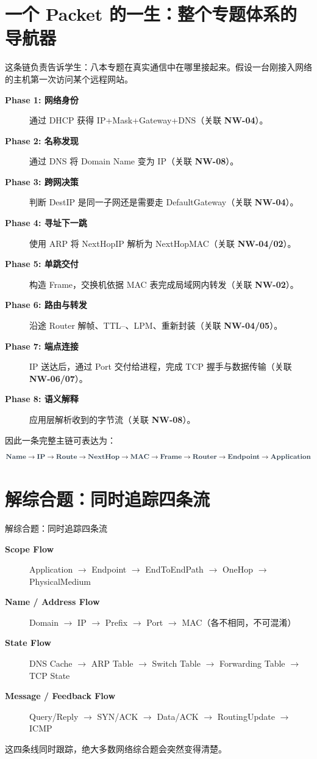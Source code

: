 \documentclass[11pt,a4paper,openany]{ctexbook}
\newcommand{\key}[1]{\textbf{\color{deep}#1}}
\begin{document}
\section{一个 Packet 的一生：整个专题体系的导航器}
这条链负责告诉学生：八本专题在真实通信中在哪里接起来。假设一台刚接入网络的主机第一次访问某个远程网站。
\begin{description}
    \item[\key{Phase 1: 网络身份}] 通过 DHCP 获得 IP+Mask+Gateway+DNS（关联 \textbf{NW-04}）。
    \item[\key{Phase 2: 名称发现}] 通过 DNS 将 Domain Name 变为 IP（关联 \textbf{NW-08}）。
    \item[\key{Phase 3: 跨网决策}] 判断 DestIP 是同一子网还是需要走 DefaultGateway（关联 \textbf{NW-04}）。
    \item[\key{Phase 4: 寻址下一跳}] 使用 ARP 将 NextHopIP 解析为 NextHopMAC（关联 \textbf{NW-04/02}）。
    \item[\key{Phase 5: 单跳交付}] 构造 Frame，交换机依据 MAC 表完成局域网内转发（关联 \textbf{NW-02}）。
    \item[\key{Phase 6: 路由与转发}] 沿途 Router 解帧、TTL--、LPM、重新封装（关联 \textbf{NW-04/05}）。
    \item[\key{Phase 7: 端点连接}] IP 送达后，通过 Port 交付给进程，完成 TCP 握手与数据传输（关联 \textbf{NW-06/07}）。
    \item[\key{Phase 8: 语义解释}] 应用层解析收到的字节流（关联 \textbf{NW-08}）。
\end{description}
因此一条完整主链可表达为：
\[
\key{Name} \rightarrow \key{IP} \rightarrow \key{Route} \rightarrow \key{NextHop} \rightarrow \key{MAC} \rightarrow \key{Frame} \rightarrow \key{Router} \rightarrow \key{Endpoint} \rightarrow \key{Application}
\]

\section{解综合题：同时追踪四条流}
\begin{methodbox}{解综合题：同时追踪四条流}
\begin{description}
    \item[\key{Scope Flow}] Application $\rightarrow$ Endpoint $\rightarrow$ EndToEndPath $\rightarrow$ OneHop $\rightarrow$ PhysicalMedium
    \item[\key{Name / Address Flow}] Domain $\rightarrow$ IP $\rightarrow$ Prefix $\rightarrow$ Port $\rightarrow$ MAC（各不相同，不可混淆）
    \item[\key{State Flow}] DNS Cache $\rightarrow$ ARP Table $\rightarrow$ Switch Table $\rightarrow$ Forwarding Table $\rightarrow$ TCP State
    \item[\key{Message / Feedback Flow}] Query/Reply $\rightarrow$ SYN/ACK $\rightarrow$ Data/ACK $\rightarrow$ RoutingUpdate $\rightarrow$ ICMP
\end{description}
\end{methodbox}
这四条线同时跟踪，绝大多数网络综合题会突然变得清楚。
\end{document}
